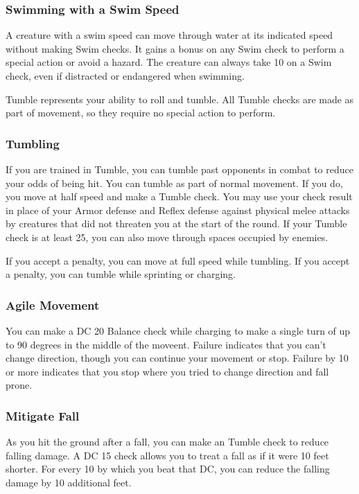 \subsubsection{Swimming with a Swim Speed}
A creature with a swim speed can move through water at its indicated speed without making Swim checks. It gains a  bonus on any Swim check to perform a special action or avoid a hazard. The creature can always take 10 on a Swim check, even if distracted or endangered when swimming.

Tumble represents your ability to roll and tumble. All Tumble checks are made as part of movement, so they require no special action to perform.

\subsubsection{Tumbling}

If you are trained in Tumble, you can tumble past opponents in combat to reduce your odds of being hit. You can tumble as part of normal movement. If you do, you move at half speed and make a Tumble check. You may use your check result in place of your Armor defense and Reflex defense against physical melee attacks by creatures that did not threaten you at the start of the round. If your Tumble check is at least 25, you can also move through spaces occupied by enemies.

If you accept a  penalty, you can move at full speed while tumbling. If you accept a  penalty, you can tumble while sprinting or charging.

\subsubsection{Agile Movement}
You can make a DC 20 Balance check while charging to make a single turn of up to 90 degrees in the middle of the moveent. Failure indicates that you can't change direction, though you can continue your movement or stop. Failure by 10 or more indicates that you stop where you tried to change direction and fall prone.

\subsubsection{Mitigate Fall}
As you hit the ground after a fall, you can make an Tumble check to reduce falling damage. A DC 15 check allows you to treat a fall as if it were 10 feet shorter. For every 10 by which you beat that DC, you can reduce the falling damage by 10 additional feet.

